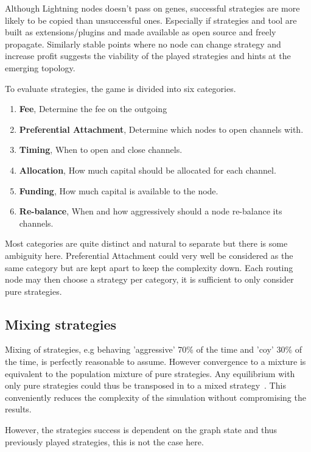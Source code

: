Although Lightning nodes doesn't pass on genes, successful strategies are more likely to be copied than unsuccessful ones. Especially if strategies and tool are built as extensions/plugins and made available as open source and freely propagate. Similarly stable points where no node can change strategy and increase profit suggests the viability of the played strategies and hints at the emerging topology. 

To evaluate strategies, the game is divided into six categories.

\begin{enumerate}
	\item \textbf{Fee}, Determine the fee on the outgoing
	\item \textbf{Preferential Attachment}, Determine which nodes to open channels with.
	\item \textbf{Timing}, When to open and close channels.
	\item \textbf{Allocation}, How much capital should be allocated for each channel.
	\item \textbf{Funding}, How much capital is available to the node.
	\item \textbf{Re-balance}, When and how aggressively should a node re-balance its channels. 
\end{enumerate}

Most categories are quite distinct and natural to separate but there is some ambiguity here. Preferential Attachment could very well be considered as the same category but are kept apart to keep the complexity down. Each routing node may then choose a strategy per category, it is sufficient to only consider pure strategies. 

\subsection{Mixing strategies}

Mixing of strategies, e.g behaving 'aggressive' 70\% of the time and 'coy' 30\% of the time, is perfectly reasonable to assume. However convergence to a mixture is equivalent to the population mixture of pure strategies. Any equilibrium with only pure strategies could thus be transposed in to a mixed strategy~\cite{easly:kleinberg:network:crowds:markets}. This conveniently reduces the complexity of the simulation without compromising the results. 

However, the strategies success is dependent on the graph state and thus previously played strategies, this is not the case here. 

